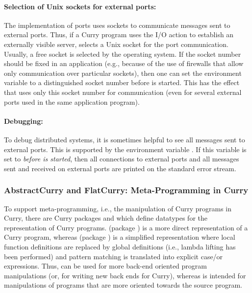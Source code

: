 {\paragraph{Selection of Unix sockets for external ports:}
The implementation of ports uses sockets to communicate
messages sent to external ports.
Thus, if a Curry program uses the
I/O action 
to establish an externally visible server,
\CYS selects a Unix socket for the port communication.
Usually, a free socket is selected by the operating system.
If the socket number should be fixed in an application (e.g.,
because of the use of firewalls that allow only
communication over particular sockets), then one
can set the environment variable 
to a distinguished socket number before \CYS is started.
This has the effect that \CYS uses only this socket
number for communication (even for several external ports
used in the same application program).

\paragraph{Debugging:}
To debug distributed systems,
it is sometimes helpful to see all messages sent to external ports.
This is supported by the environment variable
.
If this variable is set to 
\emph{before \CYS is started}, then all
connections to external ports and all
messages sent and received on external ports are
printed on the standard error stream.


\subsubsection{AbstractCurry and FlatCurry: Meta-Programming in Curry}
\label{sec-flatcurry}

To support meta-programming, i.e., the manipulation of Curry programs
in Curry, there are Curry packages  and 
which define datatypes for the representation of Curry programs.
 (package )
is a more direct representation of a Curry program,
whereas  (package )
is a simplified representation
where local function definitions are replaced by global definitions
(i.e., lambda lifting has been performed) and pattern matching
is translated into explicit case/or expressions.
Thus,  can be used for more back-end oriented
program manipulations (or, for writing new back ends for Curry),
whereas  is intended for manipulations of
programs that are more oriented towards the source program.

}
